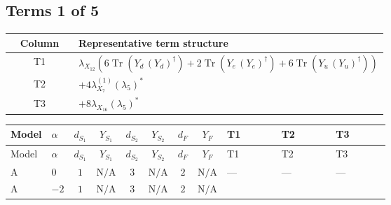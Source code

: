 \documentclass[8pt]{article}
\begin{document}
\begin{landscape}
\subsection*{Terms 1 of 5}
\begin{center}
\begin{tabular}{@{}c >{\raggedright\arraybackslash}p{0.82\linewidth}@{}}
\toprule
Column & Representative term structure \\
\midrule
T1 & \(\displaystyle {\lambda_{X_{12}}} (6 \operatorname{Tr}\!\left({Y_d}\,\left({Y_d}\right)^{\dagger}\right)+2 \operatorname{Tr}\!\left({Y_e}\,\left({Y_e}\right)^{\dagger}\right)+6 \operatorname{Tr}\!\left({Y_u}\,\left({Y_u}\right)^{\dagger}\right))\) \\
\midrule
T2 & \(\displaystyle +4 {\lambda_{X_{7}}^{(1)}} \left({\lambda_5}\right)^{*}\) \\
\midrule
T3 & \(\displaystyle +8 {\lambda_{X_{16}}} \left({\lambda_5}\right)^{*}\) \\
\midrule
\bottomrule
\end{tabular}
\end{center}
\smallskip
\tiny
\begin{longtable}{@{}llcccccc >{\raggedright\arraybackslash}p{0.21\linewidth} >{\raggedright\arraybackslash}p{0.21\linewidth} >{\raggedright\arraybackslash}p{0.21\linewidth}@{}}
\toprule
Model & $\alpha$ & $d_{S_1}$ & $Y_{S_1}$ & $d_{S_2}$ & $Y_{S_2}$ & $d_F$ & $Y_F$ & T1 & T2 & T3 \\
\midrule
\endfirsthead
\toprule
Model & $\alpha$ & $d_{S_1}$ & $Y_{S_1}$ & $d_{S_2}$ & $Y_{S_2}$ & $d_F$ & $Y_F$ & T1 & T2 & T3 \\
\midrule
\endhead
A & $0$ & $1$ & $\text{N/A}$ & $3$ & $\text{N/A}$ & $2$ & $\text{N/A}$ & --- & --- & --- \\
\midrule
A & $-2$ & $1$ & $\text{N/A}$ & $3$ & $\text{N/A}$ & $2$ & $\text{N/A}$ & \scriptsize\adjustbox{max width=\linewidth}{$\begin{gathered} {\lambda_{X_{12}}} (6 \operatorname{Tr}\!\left({Y_d}\,\left({Y_d}\right)^{\dagger}\right)+2 \operatorname{Tr}\!\left({Y_e}\,\left({Y_e}\right)^{\dagger}\right)+6 \operatorname{Tr}\!\left({Y_u}\,\left({Y_u}\right)^{\dagger}\right))\end{gathered}$} & \scriptsize\adjustbox{max width=\linewidth}{$\begin{gathered} +4 {\lambda_{X_{7}}^{(1)}} \left({\lambda_5}\right)^{*}\end{gathered}$} & \scriptsize\adjustbox{max width=\linewidth}{$\begin{gathered} +8 {\lambda_{X_{16}}} \left({\lambda_5}\right)^{*}\end{gathered}$} \\

\end{longtable}
\end{landscape}
\end{document}
